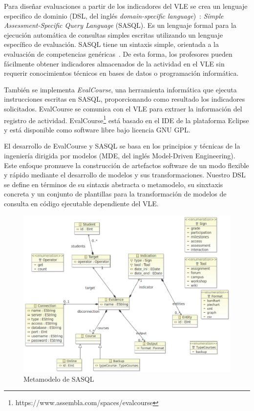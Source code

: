 Para diseñar evaluaciones a partir de los indicadores del VLE se crea un lenguaje especifico de dominio (DSL, del inglés \emph{domain-specific language})~\cite{vanDeursen:2000}: \emph{Simple Assessment-Specific Query Language} (SASQL). Es un lenguaje formal para la ejecución automática de consultas simples escritas utilizando un lenguaje específico de evaluación. SASQL tiene un sintaxis simple, orientada a la evaluación de competencias genéricas~\cite{Balderas:2013}. De esta forma, los profesores pueden fácilmente obtener indicadores almacenados de la actividad en el VLE sin requerir conocimientos técnicos en bases de datos o programación informática.

También se implementa \emph{EvalCourse}, una herramienta informática que ejecuta instrucciones escritas en SASQL, proporcionando como resultado los indicadores solicitados. EvalCourse se comunica con el VLE para extraer la información del registro de actividad. EvalCourse\footnote{https://www.assembla.com/spaces/evalcourse} está basado en el IDE de la plataforma Eclipse y está disponible como software libre bajo licencia GNU GPL.

El desarrollo de EvalCourse y SASQL se basa en los principios y técnicas de la ingeniería dirigida por modelos (MDE, del inglés Model-Driven Engineering). Este enfoque promueve la construcción de artefactos software de un modo flexible y rápido mediante el desarrollo de modelos y sus transformaciones. Nuestro DSL se define en términos de su sintaxis abstracta o metamodelo, su sinxtaxis concreta y un conjunto de plantillas para la transformación de modelos de consulta en código ejecutable dependiente del VLE.

\begin{figure}
  \begin{center}
    \includegraphics[scale=0.4]{EvcMetamodel.png}
  \end{center}
  \caption{Metamodelo de SASQL}
  \label{fig:EvcMetamodel}
\end{figure}

